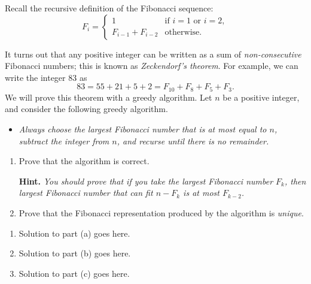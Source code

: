 \documentclass{article}
\begin{document}
\begin{question}
Recall the recursive definition of the Fibonacci sequence: \[F_i = \begin{cases}1 & \text{if } i = 1 \text{ or } i = 2, \\ F_{i - 1} + F_{i - 2} & \text{otherwise.}\end{cases}\]

It turns out that any positive integer can be written as a sum of {\em non-consecutive} Fibonacci numbers; this is known as {\em Zeckendorf's theorem}. For example, we can write the integer 83 as \[83 = 55 + 21 + 5 + 2 = F_{10} + F_8 + F_5 + F_3.\] We will prove this theorem with a greedy algorithm. Let $n$ be a positive integer, and consider the following greedy algorithm.

\begin{itemize}
    \item[] {\em Always choose the largest Fibonacci number that is at most equal to $n$, subtract the integer from $n$, and recurse until there is no remainder.}
\end{itemize}

\begin{enumerate}[label = (\alph*)]
    \item Prove that the algorithm is correct.

    {\bfseries Hint.} {\em You should prove that if you take the largest Fibonacci number $F_k$, then largest Fibonacci number that can fit $n - F_k$ is at most $F_{k - 2}$.}

    \item Prove that the Fibonacci representation produced by the algorithm is {\em unique}.
\end{enumerate}
\end{question}

\begin{solution}
\begin{enumerate}[label = (\alph*)]
    \item Solution to part (a) goes here.

    \item Solution to part (b) goes here.

    \item Solution to part (c) goes here.
\end{enumerate}
\end{solution}
\end{document}
